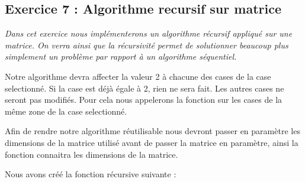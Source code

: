 \subsection{Exercice 7 : Algorithme recursif sur matrice}
\textit{Dans cet exercice nous implémenterons un algorithme récursif appliqué sur une matrice. On verra ainsi que la récursivité permet de solutionner beaucoup plus simplement un problème par rapport à un algorithme séquentiel.}

Notre algorithme devra affecter la valeur 2 à chacune des cases de la case selectionné.
Si la case est déjà égale à 2, rien ne sera fait.
Les autres cases ne seront pas modifiés.
Pour cela nous appelerons la fonction sur les cases de la même zone de la case selectionné.

Afin de rendre notre algorithme réutilisable nous devront passer en paramètre les dimensions de la matrice utilisé avant de passer la matrice en paramètre, ainsi la fonction connaitra les dimensions de la matrice.

Nous avons créé la fonction récursive suivante :

\inputminted[linenos,firstline=8, lastline=25]{cpp}{../sources/cpp/TP1-2/bubbleBreaker.c}

